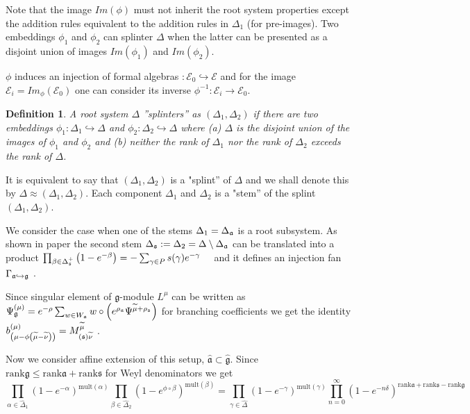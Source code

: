 \documentclass[12pt]{article}
\newtheorem{Def}{Definition}[section]
\newcommand{\gf}{\mathfrak{g}}
\newcommand{\af}{\mathfrak{a}}
\newcommand{\sfr}{\mathfrak{s}}
\newcommand{\gfh}{\hat{\mathfrak{g}}}
\newcommand{\afh}{\hat{\mathfrak{a}}}
\begin{document}
Note that the image $Im(\phi)$ must not inherit the root system properties except the addition rules equivalent to the addition
rules in $\Delta_{1}$ (for pre-images). Two embeddings $\phi_1$ and $\phi_2$  can splinter $\Delta$  when the latter can be presented as a disjoint union of images $Im(\phi_1)$ and $Im(\phi_2)$.   

$\phi$ induces an injection of formal algebras $:{\mathcal{E}}_0
\hookrightarrow \mathcal{E}$ and for the image ${\mathcal{E}}%
_i=Im_{\phi}\left( {\mathcal{E}}_0\right)$ one can consider its inverse $%
\phi^{-1}:{\mathcal{E}}_i \longrightarrow {\mathcal{E}}_0$.

\begin{Def}
A root system $\Delta $ ''splinters'' as $(\Delta _{1},\Delta _{2})$ if there are two embeddings $\phi _{1}:\Delta _{1}\hookrightarrow \Delta $ and $%
\phi _{2}:\Delta _{2}\hookrightarrow \Delta $ where (a) $\Delta $ is the disjoint union of the images of $\phi _{1}$ and $\phi _{2}$ and (b) neither the rank of $\Delta _{1}$ nor the rank of $\Delta _{2}$ exceeds the rank of $%
\Delta $.
\end{Def}

It is equivalent to say that $(\Delta_1,\Delta_2)$ is a "splint'' of $\Delta$ and we shall denote this by $\Delta \approx (\Delta_1,\Delta_2)$. Each component $\Delta_1$ and $\Delta_2$ is a "stem'' of the splint $%
(\Delta_1,\Delta_2)$.

We consider the case when one of the stems $\Delta _{1}=\Delta _{\frak{a}}$ is a root subsystem. As shown in paper \cite{2011arXiv1111.6787L} the second stem $\Delta _{\frak{s}}:=\Delta
_{2}=\Delta \setminus \Delta _{\frak{a}}$ can be translated into a product 
$\prod_{\beta \in \Delta _{\frak{s}}^{+}}\left( 1-e^{-\beta }\right)=-\sum_{\gamma \in P}s(\gamma )e^{-\gamma }\quad   \label{splint product}$
and it defines an injection fan $\Gamma _{\frak{a}%
\hookrightarrow \frak{g}}$ \cite{lyakhovsky1996rra,ilyin812pbc,2010arXiv1007.0318L}.

Since singular element of $\gf$-module $L^{\mu}$ can be written as $\Psi _{\frak{g}}^{\left( \mu \right) }=e^{-\rho } \sum_{w\in W_{\frak{a}}}w\circ \left(
e^{\rho _{\frak{a}}}\Psi ^{\widetilde{\mu }+\rho _{\frak{s}}}\right)$  for branching coefficients we get the identity $b_{\left( \mu -\phi \left( \widetilde{\mu }-\widetilde{\nu }\right) \right)
}^{(\mu )}=M_{\left( \frak{s}\right) \widetilde{\nu }}^{\widetilde{\mu }}$  \cite{2011arXiv1111.6787L}.

Now we consider affine extension of this setup, $\afh\subset\gfh$. Since $\mathrm{rank}\gf\leq \mathrm{rank} \af+\mathrm{rank}\sfr$
for Weyl denominators we get
 \[
\prod_{\alpha\in\hat{\Delta}_{1}}(1-e^{-\alpha})^{\mathrm{mult}(\alpha)}\prod_{\beta\in\hat{\Delta}_{2}}(1-e^{\phi\circ \beta})^{\mathrm{mult}(\beta)}=\prod_{\gamma\in\hat{\Delta}}(1-e^{-\gamma})^{\mathrm{mult}(\gamma)}\prod_{n=0}^{\infty}(1-e^{-n\delta})^{\mathrm{rank}\af+\mathrm{rank}\sfr-\mathrm{rank}\gf}
\]
\end{document}
